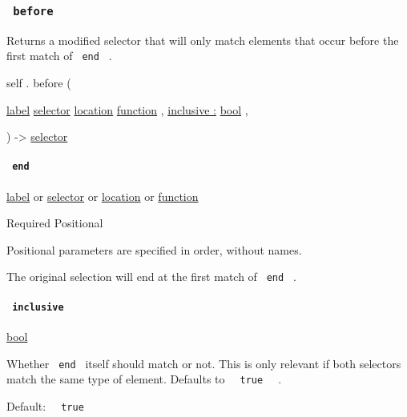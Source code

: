 \subsubsection{\texorpdfstring{\texttt{\ before\ }}{ before }}\label{definitions-before}

Returns a modified selector that will only match elements that occur
before the first match of \texttt{\ end\ } .

self { . } { before } (

{ \href{/docs/reference/foundations/label/}{label}
\href{/docs/reference/foundations/selector/}{selector}
\href{/docs/reference/introspection/location/}{location}
\href{/docs/reference/foundations/function/}{function} , } {
\hyperref[definitions-before-parameters-inclusive]{inclusive :}
\href{/docs/reference/foundations/bool/}{bool} , }

) -\textgreater{} \href{/docs/reference/foundations/selector/}{selector}

\paragraph{\texorpdfstring{\texttt{\ end\ }}{ end }}\label{definitions-before-end}

\href{/docs/reference/foundations/label/}{label} {or}
\href{/docs/reference/foundations/selector/}{selector} {or}
\href{/docs/reference/introspection/location/}{location} {or}
\href{/docs/reference/foundations/function/}{function}

{Required} {{ Positional }}

\label{definitions-before-end-positional-tooltip}
Positional parameters are specified in order, without names.

The original selection will end at the first match of \texttt{\ end\ } .

\paragraph{\texorpdfstring{\texttt{\ inclusive\ }}{ inclusive }}\label{definitions-before-inclusive}

\href{/docs/reference/foundations/bool/}{bool}

Whether \texttt{\ end\ } itself should match or not. This is only
relevant if both selectors match the same type of element. Defaults to
\texttt{\ }{\texttt{\ true\ }}\texttt{\ } .

Default: \texttt{\ }{\texttt{\ true\ }}\texttt{\ }

